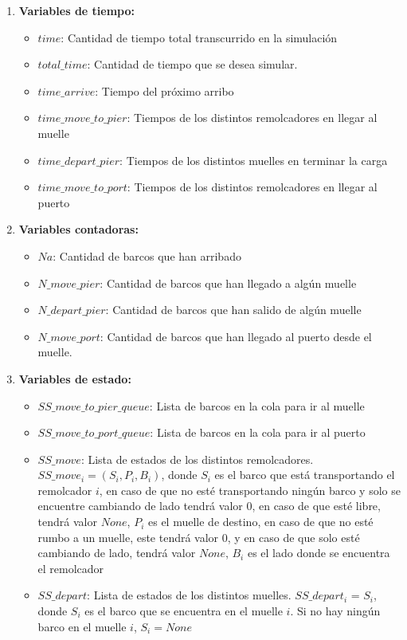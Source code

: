 \documentclass[titlepage,11pt]{scrartcl}
\begin{document}
	\begin{enumerate}
		\item \textbf{Variables de tiempo:}
			\begin{itemize}
				\item $time$: Cantidad de tiempo total transcurrido en la simulación
				\item $total\_time$: Cantidad de tiempo que se desea simular.
				\item $time\_arrive$: Tiempo del próximo arribo
				\item $time\_move\_to\_pier$: Tiempos de los distintos remolcadores en llegar al muelle
				\item $time\_depart\_pier$: Tiempos de los distintos muelles en terminar la carga
				\item $time\_move\_to\_port$: Tiempos de los distintos remolcadores en llegar al puerto
			\end{itemize}
		\item \textbf{Variables contadoras:}
			\begin{itemize}
				\item $Na$: Cantidad de barcos que han arribado
				\item $N\_move\_pier$: Cantidad de barcos que han llegado a algún muelle
				\item $N\_depart\_pier$: Cantidad de barcos que han salido de algún muelle
				\item $N\_move\_port$: Cantidad de barcos que han llegado al puerto desde el muelle.
			\end{itemize}
		\item \textbf{Variables de estado:}
			\begin{itemize}
				\item $SS\_move\_to\_pier\_queue$: Lista de barcos en la cola para ir al muelle
				\item $SS\_move\_to\_port\_queue$: Lista de barcos en la cola para ir al puerto
				\item $SS\_move$: Lista de estados de los distintos remolcadores. $SS\_move_i = (S_i, P_i, B_i)$, donde $S_i$ es el barco que está transportando el remolcador $i$, en caso de que no esté transportando ningún barco y solo se encuentre cambiando de lado tendrá valor $0$, en caso de que esté libre, tendrá valor $None$, $P_i$ es el muelle de destino, en caso de que no esté rumbo a un muelle, este tendrá valor $0$, y en caso de que solo esté cambiando de lado, tendrá valor $None$, $B_i$ es el lado donde se encuentra el remolcador
				\item $SS\_depart$: Lista de estados de los distintos muelles. $SS\_depart_i$ = $S_i$, donde $S_i$ es el barco que se encuentra en el muelle $i$. Si no hay ningún barco en el muelle $i$, $S_i = None$

\end{itemize}
\end{enumerate}
\end{document}
